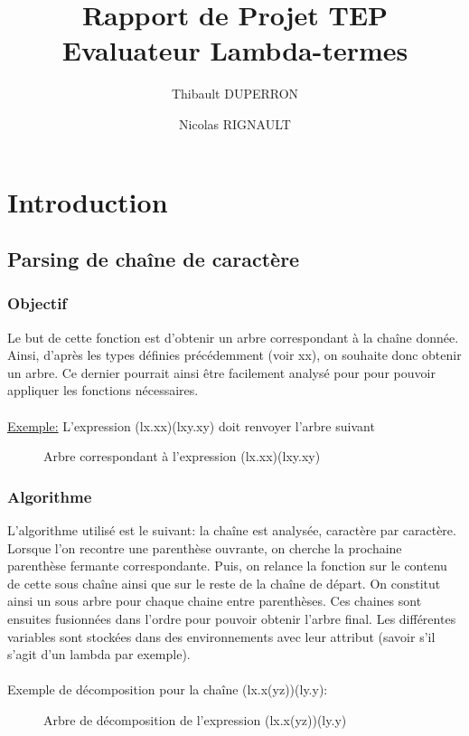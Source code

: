 \documentclass[a4paper,11pt,titlepage]{article}
\title{Rapport de Projet TEP\\Evaluateur Lambda-termes}
\author{Thibault DUPERRON \and Nicolas RIGNAULT}
\begin{document}
\renewcommand{\bibname}{}
\renewcommand{\refname}{}
\maketitle
\tableofcontents

\newpage
\section{Introduction}

\subsection{Parsing de chaîne de caractère}


\subsubsection{Objectif}
Le but de cette fonction est d'obtenir un arbre correspondant à la chaîne donnée. Ainsi, d'après les types définies précédemment (voir xx), on souhaite donc obtenir un arbre. Ce dernier pourrait ainsi être facilement analysé pour pour pouvoir appliquer les fonctions nécessaires.
\\
\\\underline{Exemple:} L'expression (lx.xx)(lxy.xy) doit renvoyer l'arbre suivant
\begin{figure}[H]
\centering
  {
	 {{
		 {
			  {
			   {}
			   {}
			  }
		 }
	 }
	{
		 {
			  {
			   {{}
			   {}}
			  }
		 }
	}}
  }
\caption{Arbre correspondant à l'expression (lx.xx)(lxy.xy)}
 \label{tree1}
\end{figure}

\subsubsection{Algorithme}
L'algorithme utilisé est le suivant: la chaîne est analysée, caractère par caractère. Lorsque l'on recontre une parenthèse ouvrante, on cherche la prochaine parenthèse fermante correspondante. Puis, on relance la fonction sur le contenu de cette sous chaîne ainsi que sur le reste de la chaîne de départ. On constitut ainsi un sous arbre pour chaque chaine entre parenthèses. Ces chaines sont ensuites fusionnées dans l'ordre pour pouvoir obtenir l'arbre final.
Les différentes variables sont stockées dans des environnements avec leur attribut (savoir s'il s'agit d'un lambda par exemple).
\\
\\Exemple de décomposition pour la chaîne (lx.x(yz))(ly.y):
\begin{figure}[H]
\centering
  {
	 {{
			  {
			   {}
			   {}
			  }
		 
	 }
	{}
	}
  }
\caption{Arbre de décomposition de l'expression (lx.x(yz))(ly.y)}
 \label{tree2}
\end{figure}
\end{document}
